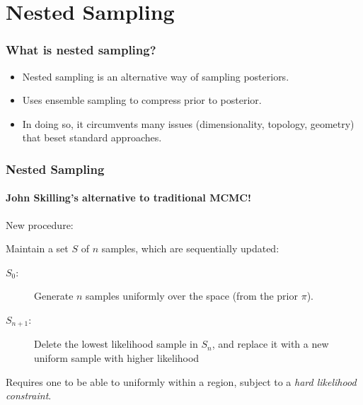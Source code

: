 \documentclass[%
]{beamer}
\newcommand{\prior}{\pi}
\begin{document}
\section{Nested Sampling}

\begin{frame}
  \frametitle{What is nested sampling?}
  \begin{itemize}
    \item Nested sampling is an alternative way of sampling posteriors. 
    \item Uses ensemble sampling to compress prior to posterior.
    \item In doing so, it circumvents many issues (dimensionality, topology, geometry) that beset standard approaches.
  \end{itemize}
\end{frame}


\begin{frame}
  \frametitle{Nested Sampling} 
  \framesubtitle{John Skilling's alternative to traditional MCMC!} 

  
  New procedure: 

  
  Maintain a set $S$ of $n$ samples, which are sequentially updated:

  \begin{description}
      
    \item[$S_0$:] Generate $n$ samples uniformly over the space (from the prior $\prior$). 
      
    \item[$S_{n+1}$:] Delete the lowest likelihood sample in $S_{n}$, and replace it with a new uniform sample with higher likelihood
  \end{description}

  
  Requires one to be able to uniformly within a region, subject to a {\em hard likelihood constraint}.

\end{frame}



\end{document}
